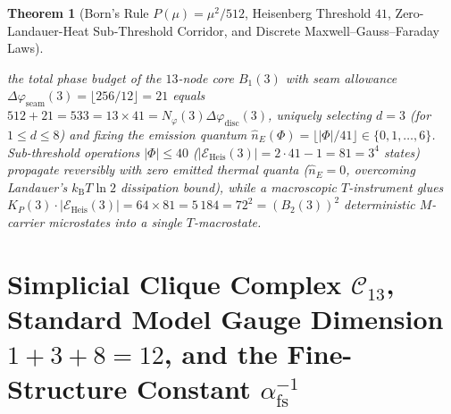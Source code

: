 \documentclass[11pt,a4paper]{article}
\theoremstyle{plain}
\newtheorem{theorem}{Theorem}[section]
\theoremstyle{definition}
\begin{document}
\begin{theorem}[Born's Rule $P(\mu)=\mu^2/512$, Heisenberg Threshold $41$, Zero-Landauer-Heat Sub-Threshold Corridor, and Discrete Maxwell--Gauss--Faraday Laws]
\begin{enumerate}[label=\textbf{(\roman*)},leftmargin=*]
  the total phase budget of the $13$-node core $B_1(3)$ with seam allowance $\Delta\varphi_{\mathrm{seam}}(3) = \lfloor 256/12\rfloor = 21$ equals $512 + 21 = 533 = 13\times 41 = N_\varphi(3)\Delta\varphi_{\mathrm{disc}}(3)$, uniquely selecting $d=3$ (for $1\le d\le 8$) and fixing the emission quantum $\hat{n}_E(\Phi) = \lfloor |\Phi|/41\rfloor \in \{0,1,\dots,6\}$. Sub-threshold operations $|\Phi|\le 40$ ($|\mathcal{E}_{\mathrm{Heis}}(3)| = 2\cdot 41 - 1 = 81 = 3^4$ states) propagate reversibly with zero emitted thermal quanta ($\hat{n}_E = 0$, overcoming Landauer's $k_{\mathrm{B}}T\ln 2$ dissipation bound), while a macroscopic $T$-instrument glues $K_P(3)\cdot |\mathcal{E}_{\mathrm{Heis}}(3)| = 64\times 81 = 5\,184 = 72^2 = (B_2(3))^2$ deterministic $M$-carrier microstates into a single $T$-macrostate.
\end{enumerate}
\end{theorem}

\section{Simplicial Clique Complex \texorpdfstring{$\mathcal{C}_{13}$}{C13}, Standard Model Gauge Dimension \texorpdfstring{$1+3+8=12$}{1+3+8=12}, and the Fine-Structure Constant \texorpdfstring{$\alpha_{\mathrm{fs}}^{-1}$}{alpha\_fs\^{}(-1)}}
\label{sec:sm-alpha}
\end{document}
